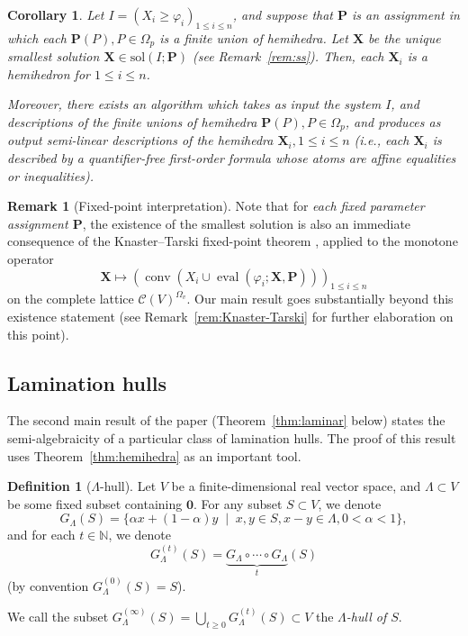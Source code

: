 \documentclass[10pt]{amsart}
\theoremstyle{plain}
\newtheorem{corollary}{Corollary}
\theoremstyle{definition}
\newtheorem{definition}[lemma]{Definition}
\newtheorem{remark}[lemma]{Remark}
\providecommand{\bP}[0]{\ensuremath{\mathbf P}\xspace}
\providecommand{\bX}[0]{\ensuremath{\mathbf X}\xspace}
\let\leq\leqslant
\let\geq\geqslant
\providecommand{\sol}{\ensuremath{\mathrm{sol}}\xspace}
\let\phi\varphi
\begin{document}
\begin{corollary}
  \label{cor:hemihedra}
    Let $I = (X_i \geq \phi_i)_{1 \leq i \leq n}$, 
    and suppose that $\bP$ is an assignment in which each $\bP(P),P \in \Omega_p $ is a finite union of hemihedra. Let $\bX$ be the unique smallest solution $\bX \in \sol(I;\bP)$
    (see Remark~\ref{rem:ss}). 
    Then, each $\bX_i$ is a hemihedron for $1 \leq i \leq n$.

    Moreover, there exists an algorithm which takes as input the system $I$, and descriptions 
    of the finite unions of hemihedra $\bP(P), P \in \Omega_p$, and produces as output 
    semi-linear descriptions of the hemihedra $\bX_i, 1 \leq i \leq n$ (i.e., each $\bX_i$ is described by a quantifier-free first-order formula whose atoms are affine equalities or inequalities).  
\end{corollary}

\begin{remark}[Fixed-point interpretation]
Note that for \emph{each fixed parameter assignment \(\mathbf P\)}, 
the existence of the
smallest solution is also an immediate consequence of the
Knaster--Tarski fixed-point theorem \cite{Tar55}, applied to the monotone operator
\[
\mathbf X\longmapsto
\left(
\operatorname{conv}
\left(
X_i\cup
\operatorname{eval}(\varphi_i;\mathbf X,\mathbf P)
\right)
\right)_{1\leq i\leq n}
\]
on the complete lattice \(\mathcal C(V)^{\Omega_v}\).
Our main result goes substantially beyond this 
existence statement (see Remark~\ref{rem:Knaster-Tarski} for further elaboration on this point).



\end{remark}


\subsection{Lamination hulls}
\label{subsec:laminar}

The second main result of the paper (Theorem~\ref{thm:laminar} below) states the semi-algebraicity of a particular class of lamination hulls. 
The proof of this result uses Theorem~\ref{thm:hemihedra} as an important tool.

\begin{definition}[$\Lambda$-hull]
\label{def:G}
Let $V$ be a finite-dimensional real vector space, and
$\Lambda \subset V$ be some fixed subset 
containing $\mathbf{0}$.
For any subset $S \subset V$, we denote
\begin{equation}
\label{eqn:G}
G_\Lambda(S) = \{\alpha x + (1-\alpha)y \; \mid \; x,y \in S, x - y \in \Lambda, 0 < \alpha < 1\},
\end{equation}
 and for each $t \in \mathbb{N}$, we denote
\[
G^{(t)}_\Lambda(S) = \underbrace{G_\Lambda \circ \cdots \circ G_{\Lambda}}_{t}(S)
\] 
(by convention $G^{(0)}_\Lambda(S)= S$).

We call the subset 
$G_\Lambda^{(\infty)}(S) = \bigcup_{t \geq 0} G^{(t)}_\Lambda(S) \subset V$ 
the \emph{$\Lambda$-hull of $S$}.
\end{definition}
\end{document}
